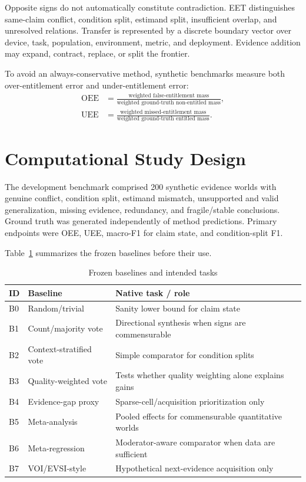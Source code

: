 \documentclass[journal]{IEEEtran}
\begin{document}
Opposite signs do not automatically constitute contradiction. EET distinguishes same-claim conflict, condition split, estimand split, insufficient overlap, and unresolved relations. Transfer is represented by a discrete boundary vector over device, task, population, environment, metric, and deployment. Evidence addition may expand, contract, replace, or split the frontier.

To avoid an always-conservative method, synthetic benchmarks measure both over-entitlement error and under-entitlement error:
\begin{align}
\mathrm{OEE}&=\frac{\text{weighted false-entitlement mass}}{\text{weighted ground-truth non-entitled mass}},\\
\mathrm{UEE}&=\frac{\text{weighted missed-entitlement mass}}{\text{weighted ground-truth entitled mass}}.
\end{align}

\section{Computational Study Design}
The development benchmark comprised 200 synthetic evidence worlds with genuine conflict, condition split, estimand mismatch, unsupported and valid generalization, missing evidence, redundancy, and fragile/stable conclusions. Ground truth was generated independently of method predictions. Primary endpoints were OEE, UEE, macro-F1 for claim state, and condition-split F1.

Table~\ref{tab:baselines} summarizes the frozen baselines before their use.
\begin{table}[H]\caption{Frozen baselines and intended tasks}\label{tab:baselines}\centering\footnotesize
\begin{tabular}{p{}p{}p{}}\toprule
ID & Baseline & Native task / role\\\midrule
B0 & Random/trivial & Sanity lower bound for claim state\\
B1 & Count/majority vote & Directional synthesis when signs are commensurable\\
B2 & Context-stratified vote & Simple comparator for condition splits\\
B3 & Quality-weighted vote & Tests whether quality weighting alone explains gains\\
B4 & Evidence-gap proxy & Sparse-cell/acquisition prioritization only\\
B5 & Meta-analysis & Pooled effects for commensurable quantitative worlds\\
B6 & Meta-regression & Moderator-aware comparator when data are sufficient\\
B7 & VOI/EVSI-style & Hypothetical next-evidence acquisition only\\\bottomrule
\end{tabular}\end{table}
\end{document}
